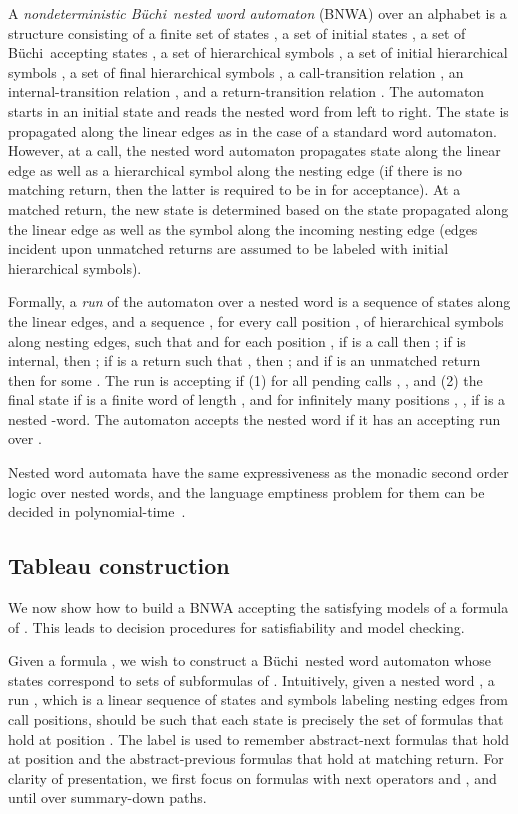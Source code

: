 \documentclass{LMCS}
\theoremstyle{plain}
\theoremstyle{definition}
\def\buchi{B\"{u}chi}
\begin{document}
A {\em nondeterministic \buchi\ nested word automaton\/} (BNWA)  
over an alphabet 
is a structure  consisting of
a finite set of states ,
a set of initial states ,
a set of \buchi\ accepting states   ,
a set of hierarchical symbols ,
a set of initial hierarchical symbols ,
a set of final hierarchical symbols ,
a call-transition relation ,
an  internal-transition relation , 
and a return-transition relation .
The automaton  starts in an initial state and reads the nested word from left to
right. The state is propagated along the linear edges as in the case of
a standard word automaton.
However, at a call, the nested word automaton propagates state
along the linear edge as well as a hierarchical symbol 
along the nesting edge 
(if there is no matching return,
then the latter is required to be in   for acceptance). 
At a matched return, the new state is determined based on the
state propagated along the linear edge as well as the symbol along the
incoming
nesting edge (edges incident upon unmatched returns are assumed to be labeled with
initial hierarchical symbols).


Formally, a {\em run\/}  of the automaton  over a nested word
 is a sequence  of
states along the linear edges,
and a sequence , for every call position , of hierarchical symbols 
along nesting edges,
such that  and for each position , if  is a call 
then ; 
if  is internal, then ; if  is a return such
that , then ;
and if  is an unmatched return then  for some .
The run  is accepting if 
(1) for all pending calls , , and 
(2) the final state  if  is a finite word of length , 
and for infinitely many positions , , if  is a nested -word.  
The automaton 
accepts the nested word  if it has an accepting run over .

Nested word automata have the same expressiveness as 
the monadic second order logic over
nested words, and the language emptiness problem for them can be
decided in polynomial-time~\cite{nested}.

\subsection{Tableau construction}



We now show how to build a BNWA
accepting the satisfying models of a formula of .
This leads to decision procedures for satisfiability and
model checking.


Given a formula , we wish to construct a \buchi\ nested word
automaton  whose states correspond to sets of subformulas
of .  Intuitively, given a nested word , a run , which
is a linear sequence  of states and symbols 
labeling nesting edges from call positions, should be such that each state  is
precisely the set of formulas that hold at position . The label
 is used to remember abstract-next formulas that hold at
position  and the abstract-previous formulas that hold at matching return.
For clarity of presentation, we first focus on formulas with next
operators  and , and until over summary-down paths.  
\end{document}

